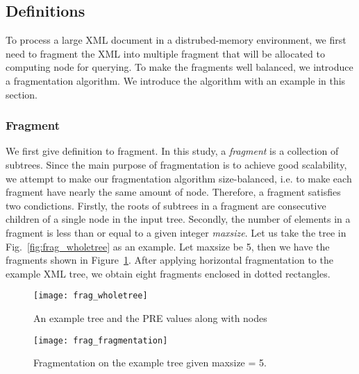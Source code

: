 \subsection{Definitions}

To process a large XML document in a distrubed-memory environment, 
we first need to fragment the XML into multiple fragment that will
be allocated to computing node for querying. To make the fragments
well balanced, we introduce a fragmentation algorithm. We introduce 
the algorithm with an example in this section.

\subsubsection{Fragment}

We first give definition to fragment. In this study, a \emph{fragment}  is a
collection of subtrees. Since the main purpose of fragmentation is to achieve
good scalability, we attempt to make our fragmentation algorithm size-balanced,
i.e. to make each fragment have nearly the same amount of node.  Therefore, a
fragment satisfies two condictions. Firstly, the roots of subtrees in a fragment
are consecutive children of a single  node in the input tree. Secondly, the
number of elements in a fragment is  less than or equal to a given integer
\emph{maxsize}.  Let us take the tree in Fig.~\ref{fig:frag_wholetree} as an
example. Let  maxsize be 5, then we have the fragments shown in
Figure~\ref{fig:frag_fragmentation}. After applying horizontal fragmentation to
the example XML tree, we obtain eight fragments enclosed in dotted rectangles.


\begin{figure}[t] 
	\centering
	\texttt{[image: frag\_wholetree]}
	\caption{An example tree and the PRE values along with nodes}
	\label{fig:frag_wholetree}
	\texttt{[image: frag\_fragmentation]}
	\caption{Fragmentation on the example tree given maxsize = 5.}
	\label{fig:frag_fragmentation}	
\end{figure}




